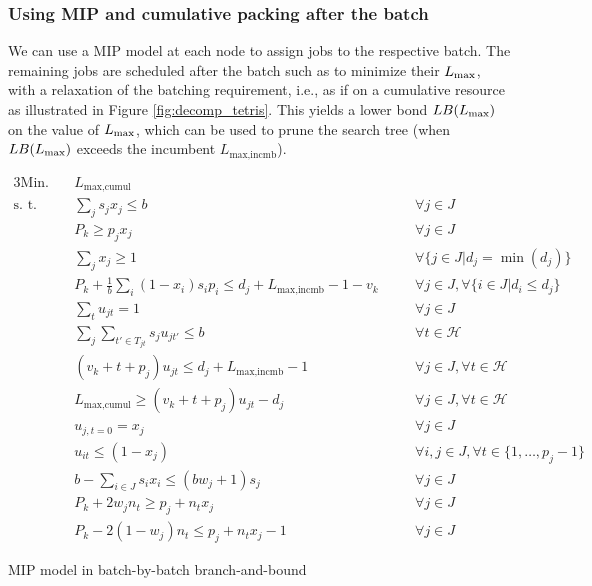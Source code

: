 \documentclass[13pt, letterpaper, oneside]{book}
\begin{document}
\subsubsection{Using MIP and cumulative packing after the batch}


We can use a
MIP model at each node to assign jobs to the respective batch. The remaining
jobs are scheduled after the batch such as to minimize their $L_{\text{max}}$, with a relaxation of the
batching requirement, i.e., as if on a cumulative resource as illustrated in
Figure \ref{fig:decomp_tetris}. This yields a lower bond $LB(L_{\text{max}})$ on the
value of $L_{\text{max}}$, which can be used to prune the search tree (when $LB(L_{\text{max}})$
exceeds the incumbent $L_\text{max,incmb}$).
\begin{model}[h!]
\begin{alignat}{3}
\text{Min.}\quad & L_{\text{max,cumul}} && \\ 
\text{s. t.}\quad & \label{dc:eq1} \sum_j s_j x_j \leq b \quad && \forall j \in J \\
& P_k \geq p_j x_j \quad && \forall j \in J \\
& \label{dc:eq3} \sum_j x_j \geq 1 \quad && \forall \{j \in J | d_j = \min(d_j)\} \\
& \label{dc:eq4} P_k + \frac{1}{b} \sum_{i} (1-x_i) s_i p_i \leq d_j +
L_{\text{max,incmb}} - 1 - v_k \quad && \forall j \in J, \forall \{i \in J | d_i
\leq d_j\} \\[2ex]
& \label{dc:eq5} \sum_t u_{jt} = 1 \quad && \forall j \in J \\
& \label{dc:eq6} \sum_j \sum_{t' \in T_{jt}} s_j u_{jt'} \leq b \quad && \forall t \in \mathcal{H} \\
& \label{dc:eq7} (v_k + t + p_j) u_{jt} \leq d_j + L_{\text{max,incmb}} - 1 \quad && \forall j \in J, \forall t \in \mathcal{H} \\
& \label{dc:eq8} L_{\text{max,cumul}} \geq (v_k + t + p_j) u_{jt} - d_j \quad && \forall j \in J, \forall t \in \mathcal{H} \\
& \label{dc:eq9} u_{j,t=0} = x_j \quad && \forall j \in J \\
& \label{dc:eq10} u_{it} \leq (1 - x_j) \quad && \forall i,j \in J, \forall t
\in \{1, \dots, p_j - 1\} \\[2ex]
& \label{dc:eq11} b - \sum_{i \in J} s_i x_i \leq (b w_j + 1) s_j \quad && \forall j \in J \\
& \label{dc:eq12} P_k + 2w_j n_t \geq p_j + n_t x_j \quad && \forall j \in J\\
& \label{dc:eq13} P_k - 2(1 - w_j)n_t \leq p_j +n_t x_j - 1 \quad && \forall j
\in J
\end{alignat}
\caption{MIP model in batch-by-batch branch-and-bound}
\label{model:decomp_mip}
\end{model}
\end{document}
